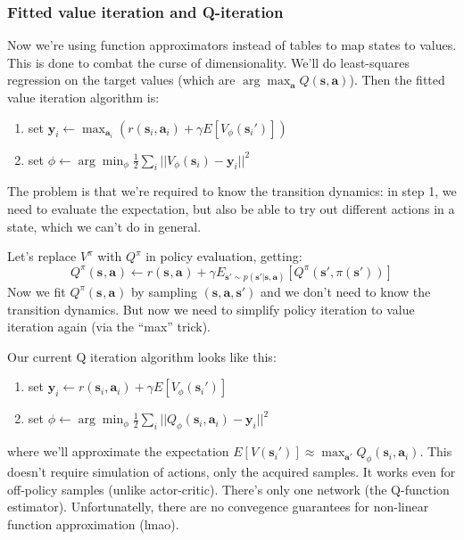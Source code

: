 \documentclass{report}
\newcommand{\argmin}{\arg\!\min}
\newcommand{\argmax}{\arg\!\max}
\begin{document}
\subsubsection{Fitted value iteration and Q-iteration}
Now we're using function approximators instead of tables to map states to values.
This is done to combat the curse of dimensionality.
We'll do least-squares regression on the target values (which are $\argmax_{\bm{a}} Q(\bm{s}, \bm{a})$).
Then the fitted value iteration algorithm is:
\begin{enumerate}
		\item set $ \bm{y}_i \leftarrow \max_{\bm{a}_i} \left( r (\bm{s}_{i}, \bm{a}_{i}) + \gamma E \left[ V_\phi (\bm{s}_i')  \right]  \right)     $ 
		\item set $ \phi \leftarrow \argmin_\phi \frac{1}{2} \sum_{i}^{} ||   V_\phi (\bm{s}_i)  - \bm{y}_i ||^2 $
\end{enumerate}
The problem is that we're required to know the transition dynamics:
in step 1, we need to evaluate the expectation, but also be able to try out different actions in a state, which we can't do in general.

Let's replace $V^\pi$ with $Q^\pi$ in policy evaluation, getting:
\begin{equation}
		Q^\pi (\bm{s}_{}, \bm{a}_{}) \leftarrow r(\bm{s}_{}, \bm{a}_{}) + 
		\gamma E_{\bm{s}' \sim p(\bm{s}'| \bm{s}, \bm{a})}
		\left[ Q^\pi(\bm{s}', \pi(\bm{s}')) \right] 
\end{equation}
Now we fit $ Q^\pi(\bm{s}_{}, \bm{a}_{}) $ by sampling $(\bm{s}, \bm{a}, \bm{s}')$
and we don't need to know the transition dynamics.
But now we need to simplify policy iteration to value iteration again (via the ``max'' trick).

Our current Q iteration algorithm looks like this:
\begin{enumerate}
		\item set $ \bm{y}_i \leftarrow r(\bm{s}_{i}, \bm{a}_{i}) + \gamma E \left[ V_\phi (\bm{s}_i') \right]      $
		\item set $  \phi \leftarrow \argmin_\phi \frac{1}{2} \sum_{i}^{} || Q_\phi (\bm{s}_{i}, \bm{a}_{i}) - \bm{y}_i||^2      $
\end{enumerate}
where we'll approximate the expectation $ E \left[ V(\bm{s}_i')  \right] \approx \max_{\bm{a}'} Q_\phi(\bm{s}_{i}, \bm{a}_{i})   $.
This doesn't require simulation of actions, only the acquired samples.
It works even for off-policy samples (unlike actor-critic).
There's only one network (the Q-function estimator).
Unfortunatelly, there are no convegence guarantees for non-linear function approximation (lmao).
\end{document}
